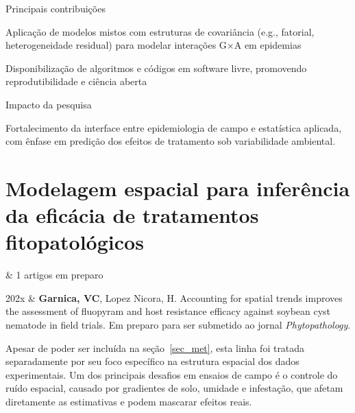 \documentclass[12pt,a4paper,oneside]{book}
\newcommand{\Me}{\textbf{Garnica, VC}}
\newcommand{\Horacio}{Lopez Nicora, H}
\begin{document}
\begin{fancyenum}{\faLightbulb}{Principais contribuições}
  \item Aplicação de modelos mistos com estruturas de covariância 
  (e.g., fatorial, heterogeneidade residual) para modelar interações G×A em epidemias
  \item Disponibilização de algoritmos e códigos em software livre, promovendo reprodutibilidade e ciência aberta
\end{fancyenum}

\begin{fancyenum}{\faRocket}{Impacto da pesquisa}
  \item Fortalecimento da interface entre epidemiologia de campo e estatística aplicada,
  com ênfase em predição dos efeitos de tratamento sob variabilidade ambiental.
\end{fancyenum}



\section{Modelagem espacial para inferência da eficácia de tratamentos fitopatológicos}
\label{sec_spatial}

\begin{summarybox}[frametitle=\faInfoCircle{}\quad Resumo da linha de pesquisa]
\begin{fa-ul}
\faFilePdf & 1 artigos em preparo \\
\end{fa-ul}
\end{summarybox}
\begin{subsummarybox}[frametitle=\faFilePdf{}\quad Artigos em preparo]
\begin{paperlist}
  202x & \Me, \Horacio.
  Accounting for spatial trends improves the assessment of fluopyram and host resistance 
  efficacy against soybean cyst nematode in field trials.
  Em preparo para ser submetido ao jornal \emph{Phytopathology}.
\\
\end{paperlist}
\end{subsummarybox}

Apesar de poder ser incluída na seção~\ref{sec_met}, esta linha foi tratada separadamente por seu foco 
específico na estrutura espacial dos dados experimentais. Um dos principais desafios em ensaios de campo é o 
controle do ruído espacial, causado por gradientes de solo, umidade e infestação, que afetam 
diretamente as estimativas e podem mascarar efeitos reais.
\end{document}
